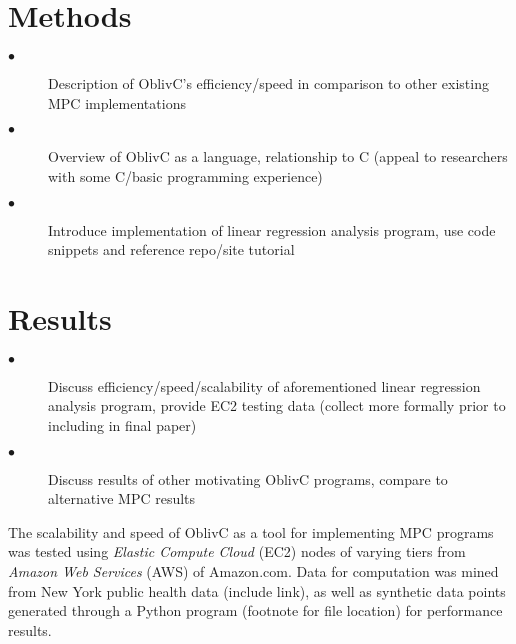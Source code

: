 \documentclass{article}
\begin{document}
\section{Methods}
\begin{description}
\item[$\bullet$] Description of OblivC’s efficiency/speed in comparison to other existing MPC implementations
\item[$\bullet$] Overview of OblivC as a language, relationship to C (appeal to researchers with some C/basic programming experience) 
\item[$\bullet$] Introduce implementation of linear regression analysis program, use code snippets and reference repo/site tutorial
\end{description}
\section{Results}
\begin{description}
\item[$\bullet$] Discuss efficiency/speed/scalability of aforementioned linear regression analysis program, provide EC2 testing data (collect more formally prior to including in final paper)
\item[$\bullet$] Discuss results of other motivating OblivC programs, compare to alternative MPC results
\end{description}

The scalability and speed of OblivC as a tool for implementing MPC programs was tested using \emph{Elastic Compute Cloud} (EC2) nodes of varying tiers from \emph{Amazon Web Services} (AWS) of Amazon.com\textregistered. Data for computation was mined from New York public health data (include link), as well as synthetic data points generated through a Python program (footnote for file location) for performance results.



\end{document}
